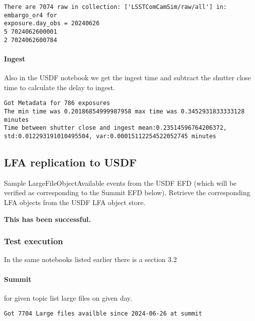 \begin{lstlisting}
There are 7074 raw in collection: ['LSSTComCamSim/raw/all'] in: embargo_or4 for
exposure.day_obs = 20240626
5 7024062600001
2 7024062600784
\end{lstlisting}

\paragraph {Ingest} \label{sec:ingest}
Also in the USDF notebook we get the ingest time and subtract the shutter close time to calculate the
delay to ingest.
\begin{lstlisting}
Got Metadata for 786 exposures
The min time was 0.20186854999987958 max time was 0.3452931833333128 minutes
Time between shutter close and ingest mean:0.23514596764206372,
std:0.012293191010495504, var:0.00015112254522052745 minutes
\end{lstlisting}

\subsection{LFA replication to USDF }
Sample LargeFileObjectAvailable events from the USDF EFD (which will be verified as corresponding to the Summit EFD below).
Retrieve the corresponding LFA objects from the USDF LFA object store.

\textbf{This has been successful.}
\subsubsection{Test execution}
In the same notebooks  listed earlier there is a section 3.2

\paragraph{Summit} for given topic list large files on given day.
\begin{lstlisting}
Got 7704 Large files availble since 2024-06-26 at summit
\end{lstlisting}

